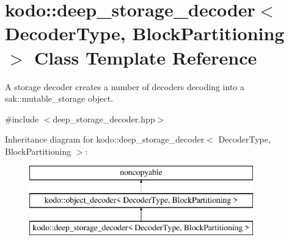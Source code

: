 \hypertarget{classkodo_1_1deep__storage__decoder}{\section{kodo\-:\-:deep\-\_\-storage\-\_\-decoder$<$ Decoder\-Type, Block\-Partitioning $>$ Class Template Reference}
\label{classkodo_1_1deep__storage__decoder}
}


A storage decoder creates a number of decoders decoding into a sak\-::mutable\-\_\-storage object.  




{\ttfamily \#include $<$deep\-\_\-storage\-\_\-decoder.\-hpp$>$}

Inheritance diagram for kodo\-:\-:deep\-\_\-storage\-\_\-decoder$<$ Decoder\-Type, Block\-Partitioning $>$\-:\begin{figure}[H]
\begin{center}
\leavevmode
\includegraphics[height=3.000000cm]{classkodo_1_1deep__storage__decoder}
\end{center}
\end{figure}
